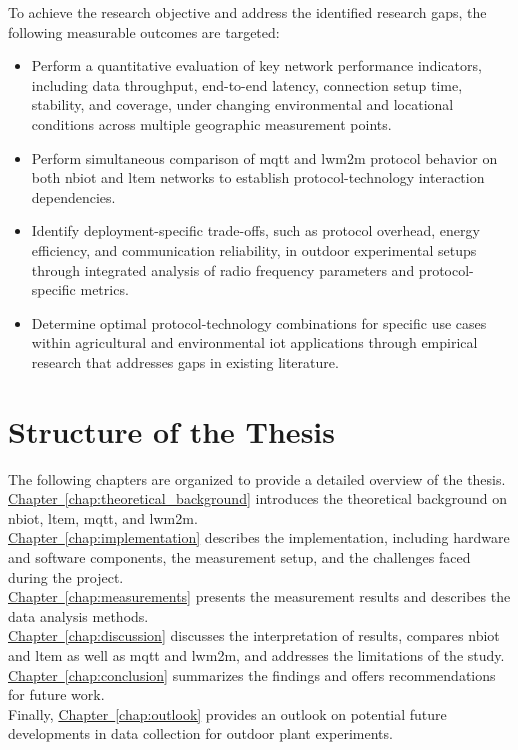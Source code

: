 \documentclass[12pt, english, openany]{book}
\begin{document}
To achieve the research objective and address the identified research gaps, the following measurable outcomes are targeted:

\begin{itemize}
    \item Perform a quantitative evaluation of key network performance indicators, including data throughput, end-to-end latency, connection setup time, stability, and coverage, under changing environmental and locational conditions across multiple geographic measurement points.
    \item Perform simultaneous comparison of \gls{mqtt} and \gls{lwm2m} protocol behavior on both \gls{nbiot} and \gls{ltem} networks to establish protocol-technology interaction dependencies.
    \item Identify deployment-specific trade-offs, such as protocol overhead, energy efficiency, and communication reliability, in outdoor experimental setups through integrated analysis of radio frequency parameters and protocol-specific metrics.
    \item Determine optimal protocol-technology combinations for specific use cases within agricultural and environmental \gls{iot} applications through empirical research that addresses gaps in existing literature.
\end{itemize}

\section{Structure of the Thesis} \label{sec:structure}
The following chapters are organized to provide a detailed overview of the thesis.\\
\hyperref[chap:theoretical_background]{Chapter~\ref*{chap:theoretical_background}} introduces the theoretical background on \gls{nbiot}, \gls{ltem}, \gls{mqtt}, and \gls{lwm2m}.\\
\hyperref[chap:implementation]{Chapter~\ref*{chap:implementation}} describes the implementation, including hardware and software components, the measurement setup, and the challenges faced during the project.\\
\hyperref[chap:measurements]{Chapter~\ref*{chap:measurements}} presents the measurement results and describes the data analysis methods.\\
\hyperref[chap:discussion]{Chapter~\ref*{chap:discussion}} discusses the interpretation of results, compares \gls{nbiot} and \gls{ltem} as well as \gls{mqtt} and \gls{lwm2m}, and addresses the limitations of the study.\\
\hyperref[chap:conclusion]{Chapter~\ref*{chap:conclusion}} summarizes the findings and offers recommendations for future work.\\
Finally, \hyperref[chap:outlook]{Chapter~\ref*{chap:outlook}} provides an outlook on potential future developments in data collection for outdoor plant experiments.
\end{document}
